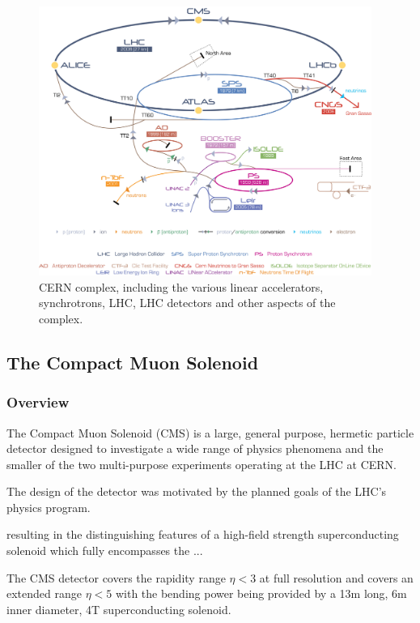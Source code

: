 \begin{figure}[htbp]
\begin{center}
\includegraphics[width=0.97\textwidth]{figs/lhc/Cern-Accelerator-Complex.jpg}
\caption{CERN complex, including the various linear accelerators, synchrotrons, LHC, LHC detectors and other aspects of the complex.}
\label{fig:cern-accelerator-complex}
\end{center}
\end{figure}

\subsection{The Compact Muon Solenoid}\label{subsec:cms}

\subsubsection{Overview}
The Compact Muon Solenoid (CMS) is a large, general purpose, hermetic particle detector designed to investigate a wide range of physics phenomena and the smaller of the two multi-purpose experiments operating at the LHC at CERN. 

The design of the detector was motivated by the planned goals of the LHC's physics program. 


resulting in the distinguishing features of a high-field strength superconducting solenoid which fully encompasses the 
...


The CMS detector covers the rapidity range $\eta < 3$ at full resolution and covers an extended range $\eta < 5$ with the bending power being provided by a 13m long, 6m inner diameter, 4T superconducting solenoid.



